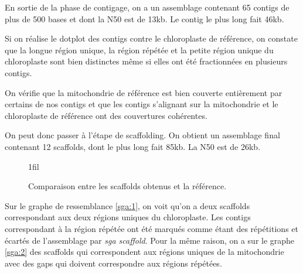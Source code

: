 \documentclass[a4paper]{article}
\makeatletter
\newcommand*{\centerfloat}{%
  \parindent \z@
  \leftskip \z@ \@plus 1fil \@minus \textwidth
  \rightskip\leftskip
  \parfillskip \z@skip}
\makeatother
\begin{document}
\label{sga} En sortie de la phase de contigage, on a un assemblage contenant 65 contigs de plus de 500 bases et dont la N50 est de 13kb. Le contig le plus long fait 46kb. 

Si on réalise le dotplot des contigs contre le chloroplaste de référence, on constate que la longue région unique, la région répétée et la petite région unique du chloroplaste sont bien distinctes même si elles ont été fractionnées en plusieurs contigs. 

On vérifie que la mitochondrie de référence est bien couverte entièrement par certains de nos contigs et que les contigs s'alignant sur la mitochondrie et le chloroplaste de référence ont des couvertures cohérentes.

On peut donc passer à l'étape de scaffolding. On obtient un assemblage final contenant 12 scaffolds, dont le plus long fait 85kb. La N50 est de 26kb. 

\begin{figure}[!ht]
\centerfloat

 \hspace{5mm}

\label{sha}
\caption{Comparaison entre les scaffolds obtenus et la référence. }
\end{figure}

Sur le graphe de ressemblance \ref{sga:1}, on voit qu'on a deux scaffolds correspondant aux deux régions uniques du chloroplaste. Les contigs correspondant à la région répétée ont été marqués comme étant des répétitions et écartés de l'assemblage par \textit{sga scaffold}. Pour la même raison, on a sur le graphe \ref{sga:2} des scaffolds qui correspondent aux régions uniques de la mitochondrie avec des gaps qui doivent correspondre aux régions répétées. 
\end{document}
